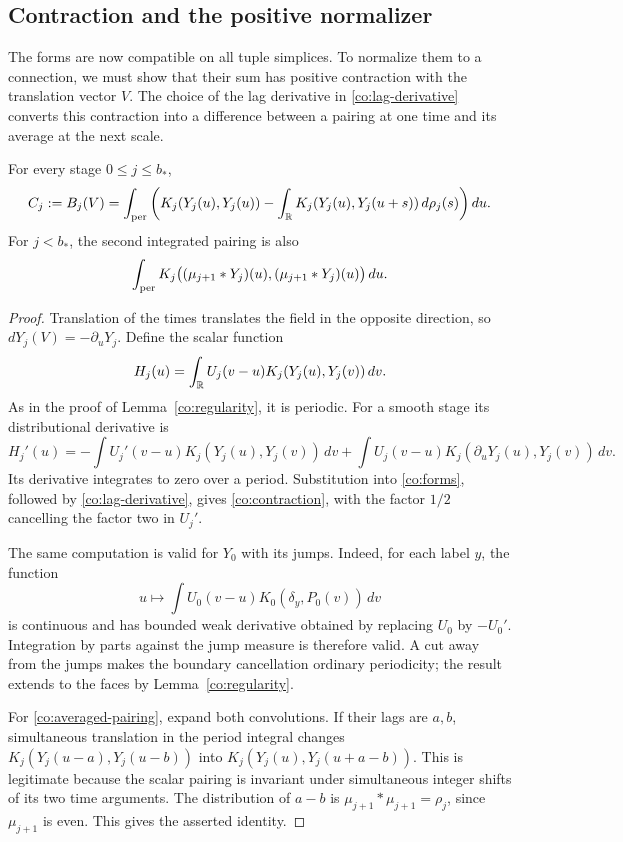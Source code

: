 \subsection{Contraction and the positive normalizer}

The forms are now compatible on all tuple simplices.  To normalize them
to a connection, we must show that their sum has positive contraction
with the translation vector $V$.  The choice of the lag derivative in
\eqref{co:lag-derivative} converts this contraction into a difference
between a pairing at one time and its average at the next scale.

\begin{lemma}
\label{co:contraction-lemma}
For every stage $0\leq j\leq b_*$,
\begin{equation}
 C_j:=B_j(V)
 =\int_{\rm per}\left(
 K_j(Y_j(u),Y_j(u))
 -\int_{\mathbb R}K_j(Y_j(u),Y_j(u+s))\,d\rho_j(s)\right)du.
 \label{co:contraction}
\end{equation}
For $j<b_*$, the second integrated pairing is also
\begin{equation}
 \int_{\rm per}
 K_j\bigl((\mu_{j+1}*Y_j)(u),(\mu_{j+1}*Y_j)(u)\bigr)\,du.
 \label{co:averaged-pairing}
\end{equation}
\end{lemma}

\begin{proof}
Translation of the times translates the field in the opposite direction,
so $dY_j(V)=-\partial_uY_j$.  Define the scalar function
\[
 H_j(u)=\int_{\mathbb R}U_j(v-u)K_j(Y_j(u),Y_j(v))\,dv.
\]
As in the proof of Lemma~\ref{co:regularity}, it is periodic.  For a
smooth stage its distributional derivative is
\[
 H_j'(u)
 =-\int U_j'(v-u)K_j(Y_j(u),Y_j(v))\,dv
  +\int U_j(v-u)K_j(\partial_uY_j(u),Y_j(v))\,dv.
\]
Its derivative integrates to zero over a period.  Substitution into
\eqref{co:forms}, followed by \eqref{co:lag-derivative}, gives
\eqref{co:contraction}, with the factor $1/2$ cancelling the factor two
in $U_j'$.

The same computation is valid for $Y_0$ with its jumps.  Indeed, for
each label $y$, the function
\[
 u\longmapsto\int U_0(v-u)K_0(\delta_y,P_0(v))\,dv
\]
is continuous and has bounded weak derivative obtained by replacing
$U_0$ by $-U_0'$.  Integration by parts against the jump measure is
therefore valid.  A cut away from the jumps makes the boundary
cancellation ordinary periodicity; the result extends to the faces by
Lemma~\ref{co:regularity}.

For \eqref{co:averaged-pairing}, expand both convolutions.  If their lags
are $a,b$, simultaneous translation in the period integral changes
$K_j(Y_j(u-a),Y_j(u-b))$ into
$K_j(Y_j(u),Y_j(u+a-b))$.  This is legitimate because the scalar pairing
is invariant under simultaneous integer shifts of its two time
arguments.  The distribution of $a-b$ is
$\mu_{j+1}*\mu_{j+1}=\rho_j$, since $\mu_{j+1}$ is even.  This gives the
asserted identity.
\end{proof}

